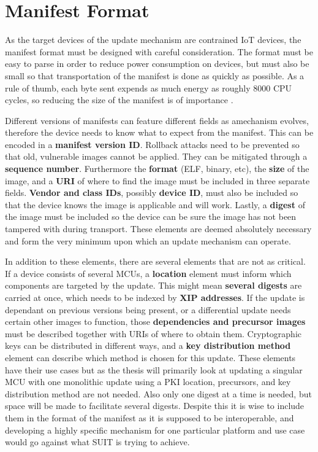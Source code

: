 \documentclass[0-thesis.tex]{subfiles}
\begin{document}

\section{Manifest Format}
\label{sec:manifest-format}
As the target devices of the update mechanism are contrained IoT devices, the manifest
format must be designed with careful consideration. The format must be easy to parse in
order to reduce power consumption on devices, but must also be small so that
transportation of the manifest is done as quickly as possible. As a rule of thumb, each
byte sent expends as much energy as roughly 8000 CPU cycles, so reducing the size of the
manifest is of importance \parencite{interconnecting}.

Different versions of manifests can feature different fields as amechanism evolves,
therefore the device needs to know what to expect from the manifest. This can be encoded
in a \textbf{manifest version ID}. Rollback attacks need to be prevented so that old,
vulnerable images cannot be applied. They can be mitigated through a \textbf{sequence
number}. Furthermore the \textbf{format} (ELF, binary, etc), the \textbf{size} of the
image, and a \textbf{URI} of where to find the image must be included in three separate
fields. \textbf{Vendor and class IDs}, possibly \textbf{device ID}, must also be included
so that the device knows the image is applicable and will work. Lastly, a \textbf{digest}
of the image must be included so the device can be sure the image has not been tampered
with during transport. These elements are deemed absolutely necessary and form the very
minimum upon which an update mechanism can operate. 

In addition to these elements, there are several elements that are not as critical. If a
device consists of several MCUs, a \textbf{location} element must inform which components
are targeted by the update. This might mean \textbf{several digests} are carried at once,
which needs to be indexed by \textbf{XIP addresses}. If the update is dependant on
previous versions being present, or a differential update needs certain other images to
function, those \textbf{dependencies and precursor images} must be described together with
URIs of where to obtain them. Cryptographic keys can be distributed in different ways, and
a \textbf{key distribution method} element can describe which method is chosen for this
update. These elements have their use cases but as the thesis will primarily look at
updating a singular MCU with one monolithic update using a PKI location, precursors, and
key distribution method are not needed. Also only one digest at a time is needed, but
space will be made to facilitate several digests. Despite this it is wise to include them
in the format of the manifest as it is supposed to be interoperable, and developing a
highly specific mechanism for one particular platform and use case would go against what
SUIT is trying to achieve.
\end{document}
